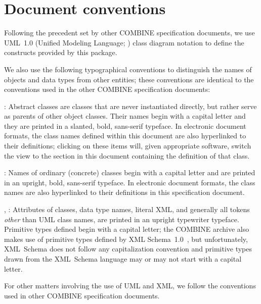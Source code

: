 \section{Document conventions} \label{conventions} 

Following the precedent set by other COMBINE specification
documents, we use UML~1.0 (Unified Modeling Language; 
\citet{eriksson:1998,oestereich:1999}) class diagram notation to 
define the constructs provided by this package. 

We also use the following typographical conventions to distinguish the 
names of objects and data types from other entities; these conventions 
are identical to the conventions used in the other COMBINE 
specification documents: 

\begin{description} 

\item {}: Abstract classes are classes that 
are never instantiated directly, but rather serve as parents of other 
object classes. Their names begin with a capital letter and they are 
printed in a slanted, bold, sans-serif typeface. In electronic document 
formats, the class names defined within this document are also 
hyperlinked to their definitions; clicking on these items will, given 
appropriate software, switch the view to the section in this document 
containing the definition of that class. 

\item {}: Names of ordinary (concrete) classes begin with a 
capital letter and are printed in an upright, bold, sans-serif typeface. 
In electronic document formats, the class names are also hyperlinked to 
their definitions in this specification document. 

\item {}, : Attributes of classes, data 
type names, literal XML, and generally all tokens \emph{other} than 
UML class names, are printed in an upright typewriter typeface. 
Primitive types defined begin with a capital letter; the COMBINE archive
also makes use of primitive types defined by XML 
Schema~1.0~\citep{biron:2000,fallside:2000,thompson:2000}, but 
unfortunately, XML~Schema does not follow any capitalization convention 
and primitive types drawn from the XML~Schema language may or may not 
start with a capital letter. 

\end{description} 

For other matters involving the use of UML and XML, we follow the 
conventions used in other COMBINE specification documents. 